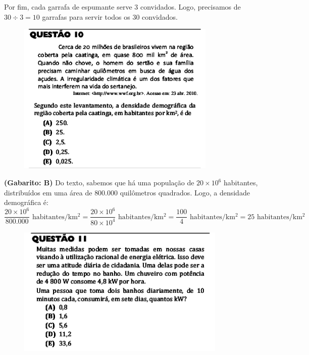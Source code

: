 \documentclass[a4paper]{article}
\begin{document}
\par\vspace{0.3cm} Por fim, cada garrafa de espumante serve $3$ convidados. Logo, precisamos de $30\div3 = 10$ garrafas para servir todos os $30$ convidados.
\begin{figure}[H]
	\begin{center}
		\includegraphics[width=9.5cm]{L2Q10.png}
	\end{center}
\end{figure}
\par\textbf{(Gabarito: B)} Do texto, sabemos que há uma população de $20\times 10^6$ habitantes, distribuídos em uma área de $800.000$ quilômetros quadrados. Logo, a densidade demográfica é:
\begin{equation*}
\frac{20\times 10^6}{800.000}\text{ habitantes/km$^2$} = \frac{20\times 10^6}{80\times 10^4}\text{ habitantes/km$^2$} = \frac{100}{4}\text{ habitantes/km$^2$} = 25\text{ habitantes/km$^2$}
\end{equation*}
\begin{figure}[H]
	\begin{center}
		\includegraphics[width=10cm]{L2Q11.png}
	\end{center}
\end{figure}
\end{document}
